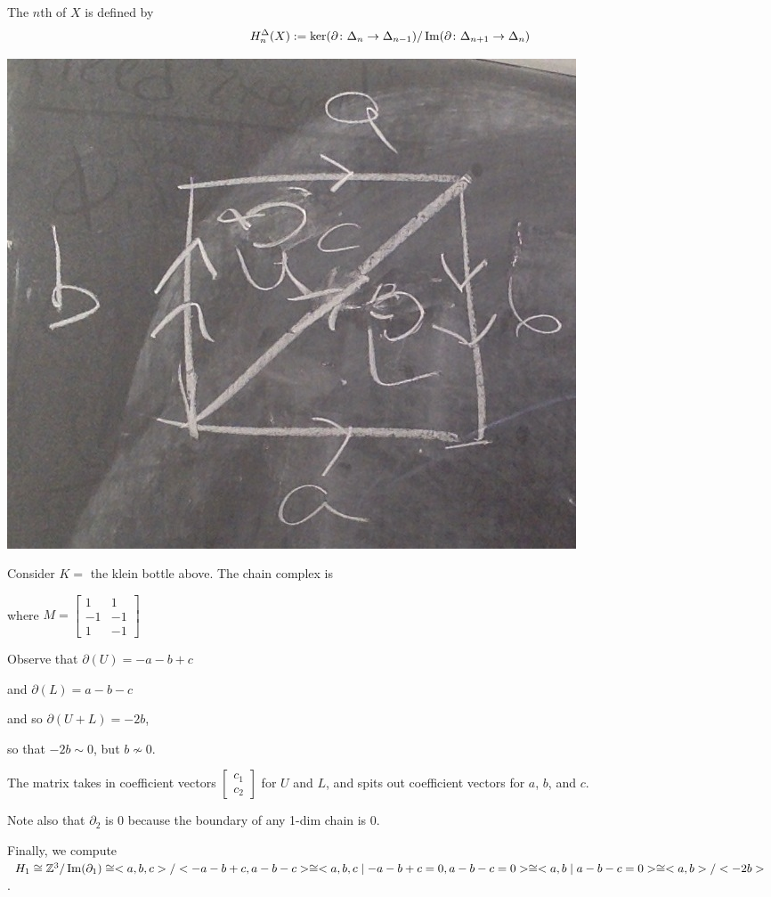 \documentclass[11pt,leqno,oneside]{amsart}
\numberwithin{thm}{section}
\renewcommand{\d}{\partial}
\newcommand{\homl}[1][n]{H_{#1}}
\begin{document}
\begin{defn}
  The $n$th  of $X$ is defined by
  $$\homl^\Delta(X) := \ker(\d \from \Delta_n \to \Delta_{n-1})/\im(\d \from \Delta_{n+1} \to \Delta_{n})$$
\end{defn}

\begin{example}
  \includegraphics[scale=0.2]{images/klein-bottle-CW}

  Consider $K =$ the klein bottle above.  The chain complex is


  where $M = \begin{bmatrix}
    1 &1 \\
    -1 &-1 \\
    1 &-1
  \end{bmatrix}$


  Observe that $\d(U) = -a -b +c$

  and $\d(L) = a - b - c$

  and so $\d(U + L) = -2b$,

  so that $-2b \sim 0$, but $b \not\sim 0$.

  The matrix takes in coefficient vectors $\begin{bmatrix}c_1 \\ c_2\end{bmatrix}$ for $U$ and $L$, and spits out coefficient vectors for $a$, $b$, and $c$.

  Note also that $\d_2$ is 0 because the boundary of any 1-dim chain is 0.

  Finally, we compute $H_1 \isom \Z^3 / \im(\d_1) \isom <a,b,c>/<-a-b+c, a-b-c> \isom <a,b,c \st -a-b+c = 0, a-b-c = 0> \isom <a,b \st a-b-c = 0> \isom <a,b>/<-2b>$.


\end{example}
\end{document}
